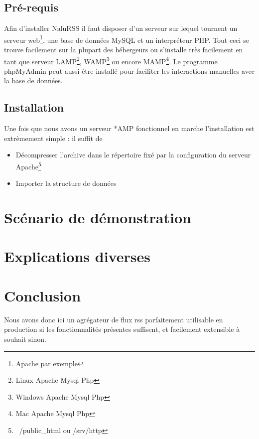 \documentclass[11pt]{article}
\begin{document}
\subsection{Pré-requis}
Afin d'installer NaluRSS il faut disposer d'un serveur sur lequel tournent un serveur web\footnote{Apache par exemple}, une base de données MySQL et un interpréteur PHP. Tout ceci se trouve facilement sur la plupart des hébergeurs ou s'installe très facilement en tant que serveur LAMP\footnote{Linux Apache Mysql Php}, WAMP\footnote{Windows Apache Mysql Php} ou encore MAMP\footnote{Mac Apache Mysql Php}. Le programme phpMyAdmin peut aussi être installé pour faciliter les interactions manuelles avec la base de données.
\subsection{Installation}
Une fois que nous avons un serveur *AMP fonctionnel en marche l'installation est extrèmement simple : il suffit de 
\begin{itemize}
\item{Décompresser l'archive dans le répertoire fixé par la configuration du serveur Apache\footnote{~/public_html ou /srv/http}}
\item{Importer la structure de données}
\end{itemize}

\section{Scénario de démonstration}

\section{Explications diverses}

\section{Conclusion}
Nous avons donc ici un agrégateur de flux rss parfaitement utilisable en production si les fonctionnalités présentes suffisent, et facilement extensible à souhait sinon.
\end{document}
